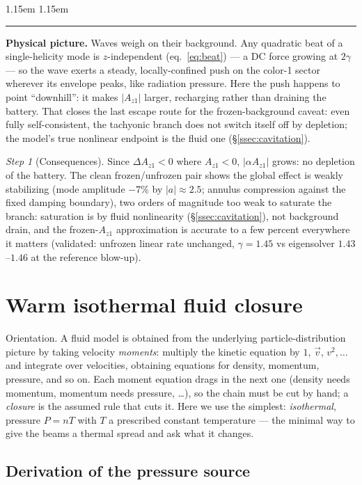 \documentclass[11pt,a4paper]{article}
\numberwithin{equation}{section}
\theoremstyle{remark}
\newtheorem{step}{Step}[subsection]
\newenvironment{intuition}%
{\par\medskip\noindent
 \begin{list}{}{\leftmargin 1.15em \rightmargin 1.15em \listparindent 0pt
 \itemindent 0pt \parsep 2pt \topsep 2pt}\item\relax
 \small\textcolor{intu}{\rule[-0.6ex]{2.6pt}{2.4ex}}\hspace{0.55em}%
 \textcolor{intu}{\textbf{Physical picture.}}\hspace{0.5em}\ignorespaces}%
{\end{list}\medskip}
\newcommand{\Az}{A_{z1}}
\begin{document}
\begin{intuition}
Waves weigh on their background. Any quadratic beat of a
single-helicity mode is $z$-independent (eq.~\eqref{eq:beat}) --- a DC
force growing at $2\gamma$ --- so the wave exerts a steady,
locally-confined push on the color-1 sector wherever its envelope
peaks, like radiation pressure. Here the push happens to point
``downhill'': it makes $|\Az|$ larger, recharging rather than draining
the battery. That closes the last escape route for the frozen-background
caveat: even fully self-consistent, the tachyonic branch does not switch
itself off by depletion; the model's true nonlinear endpoint is the
fluid one (\S\ref{ssec:cavitation}).
\end{intuition}

\begin{step}[Consequences]
Since $\Delta\Az<0$ where $\Az<0$, $|\alpha\Az|$ grows: no depletion of
the battery. The clean frozen/unfrozen pair shows the global effect is
weakly stabilizing (mode amplitude $-7\%$ by $|a|\approx2.5$; annulus
compression against the fixed damping boundary), two orders of magnitude
too weak to saturate the branch: saturation is by fluid nonlinearity
(\S\ref{ssec:cavitation}), not background drain, and the frozen-$\Az$
approximation is accurate to a few percent everywhere it matters
(validated: unfrozen linear rate unchanged, $\gamma=1.45$ vs eigensolver
$1.43$--$1.46$ at the reference blow-up).
\end{step}

\section{Warm isothermal fluid closure}
\label{sec:warm}

Orientation. A fluid model is obtained from the underlying
particle-distribution picture by taking velocity \emph{moments}:
multiply the kinetic equation by $1$, $\vec v$, $v^2,\dots$ and
integrate over velocities, obtaining equations for density, momentum,
pressure, and so on. Each moment equation drags in the next one
(density needs momentum, momentum needs pressure, \dots), so the chain
must be cut by hand; a \emph{closure} is the assumed rule that cuts it.
Here we use the simplest: \emph{isothermal}, pressure $P=nT$ with $T$ a
prescribed constant temperature --- the minimal way to give the beams a
thermal spread and ask what it changes.

\subsection{Derivation of the pressure source}
\end{document}
